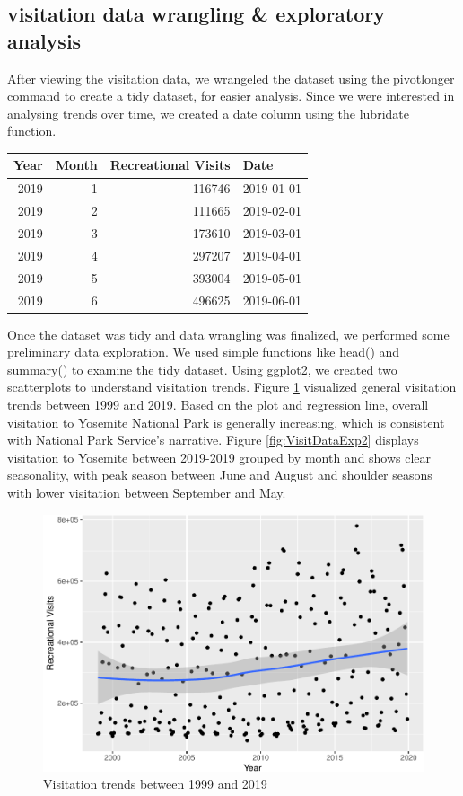 \documentclass[
  12pt,
]{article}
\begin{document}
\hypertarget{visitation-data-wrangling-exploratory-analysis}{%
\subsection{visitation data wrangling \& exploratory analysis}\label{visitation-data-wrangling-exploratory-analysis}}

After viewing the visitation data, we wrangeled the dataset using the pivotlonger command to create a tidy dataset, for easier analysis. Since we were interested in analysing trends over time, we created a date column using the lubridate function.

\begin{tabular}{r|r|r|l}
\hline
Year & Month & Recreational Visits & Date\\
\hline
2019 & 1 & 116746 & 2019-01-01\\
\hline
2019 & 2 & 111665 & 2019-02-01\\
\hline
2019 & 3 & 173610 & 2019-03-01\\
\hline
2019 & 4 & 297207 & 2019-04-01\\
\hline
2019 & 5 & 393004 & 2019-05-01\\
\hline
2019 & 6 & 496625 & 2019-06-01\\
\hline
\end{tabular}

Once the dataset was tidy and data wrangling was finalized, we performed some preliminary data exploration. We used simple functions like head() and summary() to examine the tidy dataset. Using ggplot2, we created two scatterplots to understand visitation trends. Figure \ref{fig:VisitDataExp1} visualized general visitation trends between 1999 and 2019. Based on the plot and regression line, overall visitation to Yosemite National Park is generally increasing, which is consistent with National Park Service's narrative. Figure \ref{fig:VisitDataExp2} displays visitation to Yosemite between 2019-2019 grouped by month and shows clear seasonality, with peak season between June and August and shoulder seasons with lower visitation between September and May.

\begin{figure}
\centering
\includegraphics{CodeFinal_files/figure-latex/VisitDataExp1-1.pdf}
\caption{\label{fig:VisitDataExp1}Visitation trends between 1999 and 2019}
\end{figure}
\end{document}
